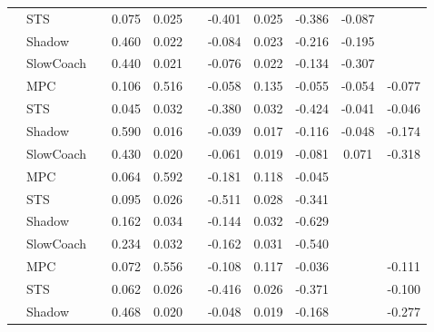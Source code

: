\begin{tabular}{|l|l|*{9}{c|}}
                                                           & STS &       &     0.075 &     0.025 &     & -0.401 &  0.025 &  -0.386 &  -0.087 &       \\
                                                           & Shadow &       &     0.460 &     0.022 &     & -0.084 &  0.023 &  -0.216 &  -0.195 &       \\
                                                           & SlowCoach &       &     0.440 &     0.021 &     & -0.076 &  0.022 &  -0.134 &  -0.307 &       \\
\midrule
[False, True, True, False, True, True, True, True, True] & MPC &       &     0.106 &     0.516 &     & -0.058 &  0.135 &  -0.055 &  -0.054 &   -0.077 \\
                                                           & STS &       &     0.045 &     0.032 &     & -0.380 &  0.032 &  -0.424 &  -0.041 &   -0.046 \\
                                                           & Shadow &       &     0.590 &     0.016 &     & -0.039 &  0.017 &  -0.116 &  -0.048 &   -0.174 \\
                                                           & SlowCoach &       &     0.430 &     0.020 &     & -0.061 &  0.019 &  -0.081 &   0.071 &   -0.318 \\
\midrule
[False, True, True, False, True, True, True, False, False] & MPC &       &     0.064 &     0.592 &     & -0.181 &  0.118 &  -0.045 &      &       \\
                                                           & STS &       &     0.095 &     0.026 &     & -0.511 &  0.028 &  -0.341 &      &       \\
                                                           & Shadow &       &     0.162 &     0.034 &     & -0.144 &  0.032 &  -0.629 &      &       \\
                                                           & SlowCoach &       &     0.234 &     0.032 &     & -0.162 &  0.031 &  -0.540 &      &       \\
\midrule
[False, True, True, False, True, True, True, False, True] & MPC &       &     0.072 &     0.556 &     & -0.108 &  0.117 &  -0.036 &      &   -0.111 \\
                                                           & STS &       &     0.062 &     0.026 &     & -0.416 &  0.026 &  -0.371 &      &   -0.100 \\
                                                           & Shadow &       &     0.468 &     0.020 &     & -0.048 &  0.019 &  -0.168 &      &   -0.277 \\

\end{tabular}
